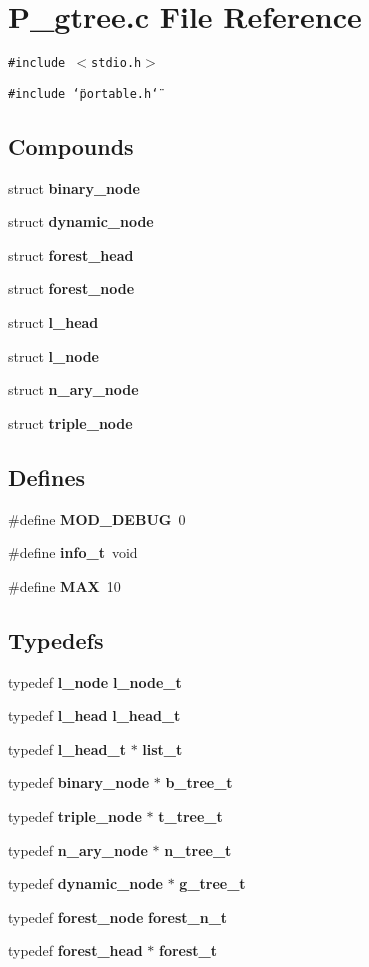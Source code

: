 \section{P\_\-gtree.c File Reference}
\label{P__gtree_8c}
{\tt \#include $<$stdio.h$>$}\par
{\tt \#include \char`\"{}portable.h\char`\"{}}\par
\subsection*{Compounds}
\begin{CompactItemize}
\item 
struct {\bf binary\_\-node}
\item 
struct {\bf dynamic\_\-node}
\item 
struct {\bf forest\_\-head}
\item 
struct {\bf forest\_\-node}
\item 
struct {\bf l\_\-head}
\item 
struct {\bf l\_\-node}
\item 
struct {\bf n\_\-ary\_\-node}
\item 
struct {\bf triple\_\-node}
\end{CompactItemize}
\subsection*{Defines}
\begin{CompactItemize}
\item 
\#define {\bf MOD\_\-DEBUG}\ 0
\item 
\#define {\bf info\_\-t}\ void
\item 
\#define {\bf MAX}\ 10
\end{CompactItemize}
\subsection*{Typedefs}
\begin{CompactItemize}
\item 
typedef {\bf l\_\-node} {\bf l\_\-node\_\-t}
\item 
typedef {\bf l\_\-head} {\bf l\_\-head\_\-t}
\item 
typedef {\bf l\_\-head\_\-t} $\ast$ {\bf list\_\-t}
\item 
typedef {\bf binary\_\-node} $\ast$ {\bf b\_\-tree\_\-t}
\item 
typedef {\bf triple\_\-node} $\ast$ {\bf t\_\-tree\_\-t}
\item 
typedef {\bf n\_\-ary\_\-node} $\ast$ {\bf n\_\-tree\_\-t}
\item 
typedef {\bf dynamic\_\-node} $\ast$ {\bf g\_\-tree\_\-t}
\item 
typedef {\bf forest\_\-node} {\bf forest\_\-n\_\-t}
\item 
typedef {\bf forest\_\-head} $\ast$ {\bf forest\_\-t}
\end{CompactItemize}
